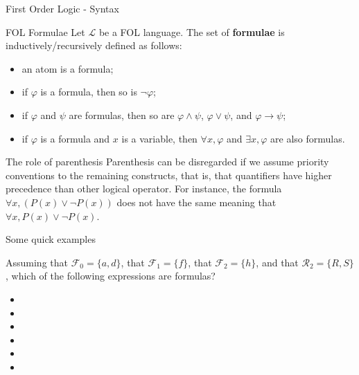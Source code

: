 \documentclass[aspectratio=169]{beamer}
\begin{document}
\begin{slide}{First Order Logic - Syntax}
  \begin{block}{FOL Formulae}  
  Let $\mathcal{L}$ be a FOL language. The set of {\bf formulae} is inductively/recursively defined  as follows:
  \begin{itemize}
  \item an atom is a formula;
  \item if $\varphi$ is a formula, then so is $\neg\varphi$;
  \item if $\varphi$ and $\psi$ are formulas, then so are $\varphi \land \psi$, $\varphi \lor \psi$, and $\varphi \to \psi$;
  \item if $\varphi$ is a formula and $x$ is a variable, then $\forall x, \varphi$ and $\exists x, \varphi$ are also formulas.
  \end{itemize}
  \end{block}
  \begin{block}{The role of parenthesis}
  Parenthesis can be disregarded if we assume priority conventions to the remaining constructs, that is, that quantifiers have higher precedence than other logical operator. For instance, the formula
  $\forall x, (P(x) \lor \neg P(x))$ does not have the same meaning that $\forall x, P(x) \lor \neg P(x)$.
  \end{block}

\end{slide}

\begin{slide}{Some quick examples}

Assuming that $\mathcal{F}_0 = \{a,d\}$, that $\mathcal{F}_1 = \{f\}$, that $\mathcal{F}_2 = \{h\}$, and that $\mathcal{R}_2 = \{R,S\}$, which of the following expressions are formulas?

\begin{itemize}
\item {}
\item {}
\item {}
\item {}
\item {}
\item {}
\end{itemize}

\end{slide}
\end{document}
